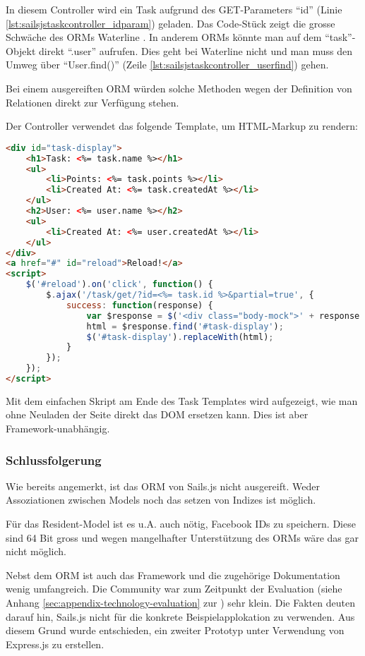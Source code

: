 In diesem Controller wird ein Task aufgrund des GET-Parameters ``id'' (Linie \ref{lst:sailsjstaskcontroller_idparam}) geladen. Das Code-Stück zeigt die grosse Schwäche des ORMs Waterline \cite{Waterline}. In anderem ORMs könnte man auf dem ``task''-Objekt direkt ``.user'' aufrufen. Dies geht bei Waterline nicht und man muss den Umweg über ``User.find()'' (Zeile \ref{lst:sailsjstaskcontroller_userfind}) gehen.

Bei einem ausgereiften ORM würden solche Methoden wegen der Definition von Relationen direkt zur Verfügung stehen.

Der Controller verwendet das folgende Template, um HTML-Markup zu rendern:

\begin{lstlisting}[language=HTML, caption=Task Template]
<div id="task-display">
	<h1>Task: <%= task.name %></h1>
	<ul>
		<li>Points: <%= task.points %></li>
		<li>Created At: <%= task.createdAt %></li>
	</ul>
	<h2>User: <%= user.name %></h2>
	<ul>
		<li>Created At: <%= user.createdAt %></li>
	</ul>
</div>
<a href="#" id="reload">Reload!</a>
<script>
	$('#reload').on('click', function() {
		$.ajax('/task/get/?id=<%= task.id %>&partial=true', {
			success: function(response) {
				var $response = $('<div class="body-mock">' + response + '</div>');
				html = $response.find('#task-display');
				$('#task-display').replaceWith(html);
			}
		});
	});
</script>
\end{lstlisting}

Mit dem einfachen Skript am Ende des Task Templates wird aufgezeigt, wie man ohne Neuladen der Seite direkt das DOM ersetzen kann. Dies ist aber Framework-unabhängig.

\subsubsection*{Schlussfolgerung}

Wie bereits angemerkt, ist das ORM von Sails.js nicht ausgereift. Weder Assoziationen zwischen Models \cite{SailsjsModelAssociations} noch das setzen von Indizes ist möglich.

Für das Resident-Model ist es u.A. auch nötig, Facebook IDs zu speichern. Diese sind 64 Bit gross und wegen mangelhafter Unterstützung des ORMs wäre das gar nicht möglich.

Nebst dem ORM ist auch das Framework und die zugehörige Dokumentation wenig umfangreich. Die Community war zum Zeitpunkt der Evaluation (siehe Anhang \ref{sec:appendix-technology-evaluation} zur ) sehr klein. Die Fakten deuten darauf hin, Sails.js nicht für die konkrete Beispielapplokation zu verwenden. Aus diesem Grund wurde entschieden, ein zweiter Prototyp unter Verwendung von Express.js zu erstellen.